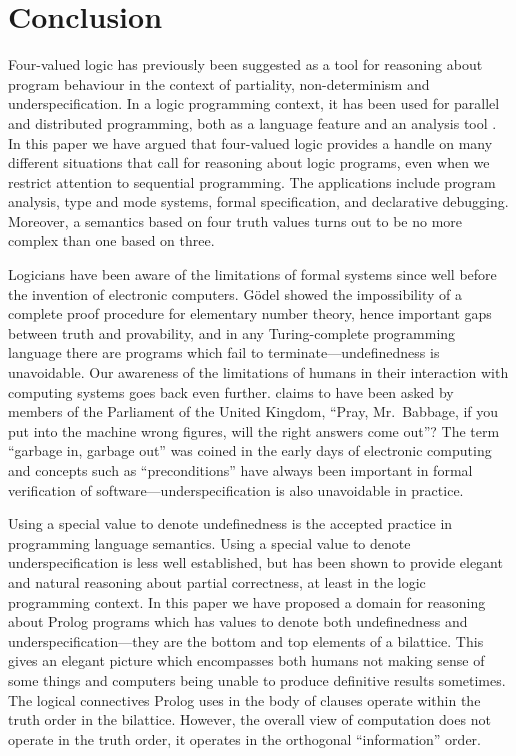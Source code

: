 \documentclass{tlp}
\begin{document}
\section{Conclusion}
\label{sec-conclusion}

Four-valued logic has previously been suggested as a tool for
reasoning about program behaviour in the context of
partiality, non-determinism and underspecification.
In a logic programming context, it has been used for parallel and
distributed programming, both as a language feature
\cite{fitting:JLP_1991} and an analysis tool \cite{Palmer97}.
In this paper we have argued that four-valued logic provides a handle
on many different situations that call for
reasoning about logic programs, 
even when we restrict attention to sequential programming.
The applications include
program analysis, 
type and mode systems,
formal specification, 
and declarative debugging.
Moreover, a semantics based on four truth values turns out
to be no more complex than one based on three.

Logicians have been aware of the limitations of formal systems since well
before the invention of electronic computers.  G{\"o}del showed the 
impossibility of a complete proof procedure for elementary number theory,
hence important gaps between truth and provability,
and in any Turing-complete programming
language there are programs which fail to terminate---undefinedness
is unavoidable.  Our awareness of the limitations of humans in
their interaction with computing systems goes back even further.
 claims to have been asked by members of the 
Parliament of the United Kingdom,
``Pray, Mr.\ Babbage, if you put into the machine wrong figures,
will the right answers come out''?  The term ``garbage in, garbage out''
was coined in the early days of electronic computing and concepts such as
``preconditions'' have always been important in formal verification of
software---underspecification is also unavoidable in practice.

Using a special value to denote undefinedness is the accepted practice
in programming language semantics.  Using a special value to denote
underspecification is less well established, but has been shown to
provide elegant and natural reasoning about partial correctness, at
least in the logic programming context.  In this paper we have proposed
a domain for reasoning about Prolog programs which has values to denote
both undefinedness and underspecification---they are the bottom and top
elements of a bilattice.  This gives an elegant picture which encompasses
both humans not making sense of some things and computers 
being unable to produce definitive results sometimes.  The logical connectives
Prolog uses in the body of clauses operate within the truth order in
the bilattice.  However, the overall view of computation does not
operate in the truth order, it operates
in the orthogonal ``information'' order.
\end{document}
